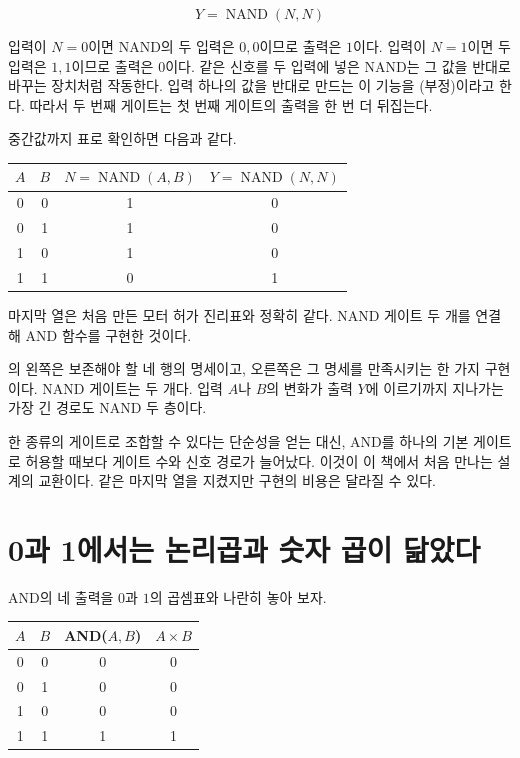 \[
  Y=\operatorname{NAND}(N,N)
\]

입력이 \(N=0\)이면 NAND의 두 입력은 \(0,0\)이므로 출력은 \(1\)이다. 입력이 \(N=1\)이면 두 입력은 \(1,1\)이므로 출력은 \(0\)이다. 같은 신호를 두 입력에 넣은 NAND는 그 값을 반대로 바꾸는 장치처럼 작동한다. 입력 하나의 값을 반대로 만드는 이 기능을 (부정)이라고 한다. 따라서 두 번째 게이트는 첫 번째 게이트의 출력을 한 번 더 뒤집는다.

중간값까지 표로 확인하면 다음과 같다.

\begin{center}
\small
\begin{tabular}{cccc}
\toprule
\sffamily\bfseries \(A\) & \sffamily\bfseries \(B\) & \sffamily\bfseries \(N=\operatorname{NAND}(A,B)\) & \sffamily\bfseries \(Y=\operatorname{NAND}(N,N)\) \\
\midrule
0 & 0 & 1 & 0 \\
0 & 1 & 1 & 0 \\
1 & 0 & 1 & 0 \\
1 & 1 & 0 & 1 \\
\bottomrule
\end{tabular}
\end{center}

마지막 열은 처음 만든 모터 허가 진리표와 정확히 같다. NAND 게이트 두 개를 연결해 AND 함수를 구현한 것이다.



의 왼쪽은 보존해야 할 네 행의 명세이고, 오른쪽은 그 명세를 만족시키는 한 가지 구현이다. NAND 게이트는 두 개다. 입력 \(A\)나 \(B\)의 변화가 출력 \(Y\)에 이르기까지 지나가는 가장 긴 경로도 NAND 두 층이다.

한 종류의 게이트로 조합할 수 있다는 단순성을 얻는 대신, AND를 하나의 기본 게이트로 허용할 때보다 게이트 수와 신호 경로가 늘어났다. 이것이 이 책에서 처음 만나는 설계의 교환이다. 같은 마지막 열을 지켰지만 구현의 비용은 달라질 수 있다.

\section{0과 1에서는 논리곱과 숫자 곱이 닮았다}

AND의 네 출력을 \(0\)과 \(1\)의 곱셈표와 나란히 놓아 보자.

\begin{center}
\small
\begin{tabular}{cccc}
\toprule
\sffamily\bfseries \(A\) & \sffamily\bfseries \(B\) & \sffamily\bfseries AND(\(A,B\)) & \sffamily\bfseries \(A\times B\) \\
\midrule
0 & 0 & 0 & 0 \\
0 & 1 & 0 & 0 \\
1 & 0 & 0 & 0 \\
1 & 1 & 1 & 1 \\
\bottomrule
\end{tabular}
\end{center}

